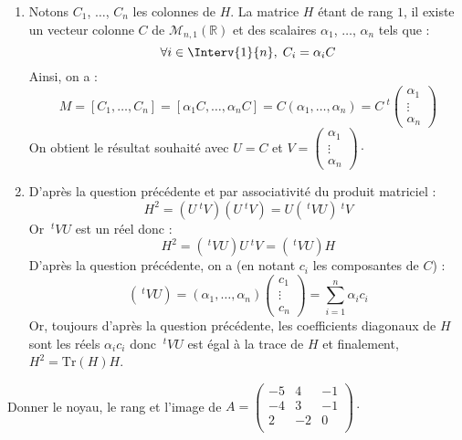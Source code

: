 \documentclass[a4paper,10pt]{report}
\begin{document}
\begin{enumerate}
\item Notons $C_1$, $\ldots$, $C_n$ les colonnes de $H$. La matrice $H$ étant de rang $1$, il existe un vecteur colonne $C$ de $\mathcal{M}_{n,1}(\mathbb{R})$ et des scalaires $\alpha_1$, $\ldots$, $\alpha_n$ tels que :
$$ \forall i \in \Interv{1}{n}, \; C_i =\alpha_i C $$
Ainsi, on a :
$$ M = [C_1, \ldots, C_n] = [\alpha_1 C, \ldots, \alpha_n C] = C (\alpha_1, \ldots, \alpha_n) = C~^t \begin{pmatrix}
\alpha_1 \\
\vdots \\
\alpha_n
\end{pmatrix}$$
On obtient le résultat souhaité avec $U=C$ et $V = \begin{pmatrix}
\alpha_1 \\
\vdots \\
\alpha_n
\end{pmatrix} \cdot$
\item D'après la question précédente et par associativité du produit matriciel :
$$ H^2 = (U ~^tV) (U ~^tV) = U( ~^tVU )~^tV$$
Or $~^tVU$ est un réel donc :
$$ H^2 = (~^tVU ) U ~^tV =  (~^tVU ) H$$
D'après la question précédente, on a (en notant $c_i$ les composantes de $C$) :
$$ (~^tVU ) = (\alpha_1, \ldots, \alpha_n) \begin{pmatrix}
c_1 \\
\vdots \\
c_n
\end{pmatrix} = \sum_{i=1}^n \alpha_i c_i $$
Or, toujours d'après la question précédente, les coefficients diagonaux de $H$ sont les réels $\alpha_i c_i$ donc $~^tVU $ est égal à la trace de $H$ et finalement, $H^2 = \textrm{Tr}(H)H$.
\end{enumerate}

\begin{Exercice}{} Donner le noyau, le rang et l'image de $A = \begin{pmatrix}
-5 & 4 & -1 \\
-4 & 3 & - 1 \\
2 	 & -2 & 0 \\
\end{pmatrix}\cdot$
\end{Exercice}
\end{document}
